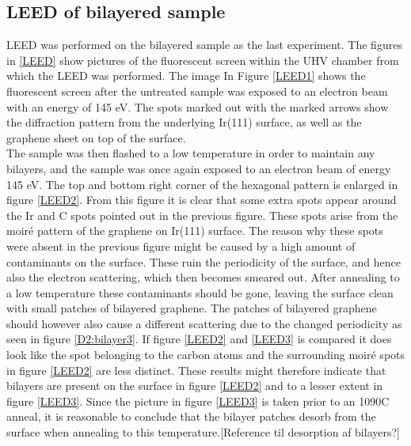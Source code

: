 \subsection{LEED of bilayered sample}
LEED was performed on the bilayered sample as the last experiment. The figures in \ref{LEED} show pictures of the fluorescent screen within the UHV chamber from which the LEED was performed. The image In Figure \ref{LEED1} shows the fluorescent screen after the untreated sample was exposed to an electron beam with an energy of 145 eV. The spots marked out with the marked arrows show the diffraction pattern from the underlying Ir(111) surface, as well as the graphene sheet on top of the surface.\cite{1367-2630-10-4-043033}\\
The sample was then flashed to a low temperature in order to maintain any bilayers, and the sample was once again exposed to an electron beam of energy 145 eV. The top and bottom right corner of the hexagonal pattern is enlarged in figure \ref{LEED2}. From this figure it is clear that some extra spots appear around the Ir and C spots pointed out in the previous figure. These spots arise from the moiré pattern of the graphene on Ir(111) surface. The reason why these spots were absent in the previous figure might be caused by a high amount of contaminants on the surface. These ruin the periodicity of the surface, and hence also the electron scattering, which then becomes smeared out. After annealing to a low temperature these contaminants should be gone, leaving the surface clean with small patches of bilayered graphene. The patches of bilayered graphene should however also cause a different scattering due to the changed periodicity as seen in figure \ref{D2:bilayer3}. If figure \ref{LEED2} and \ref{LEED3} is compared it does look like the spot belonging to the carbon atoms and the surrounding moiré spots in figure \ref{LEED2} are less distinct. These results might therefore indicate that bilayers are present on the surface in figure \ref{LEED2} and to a lesser extent in figure \ref{LEED3}. Since the picture in figure \ref{LEED3} is taken prior to an 1090\degree C anneal, it is reasonable to conclude that the bilayer patches desorb from the surface when annealing to this temperature.[Reference til desorption af bilayers?]

